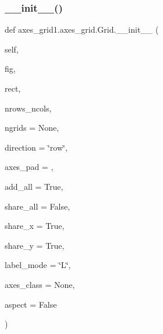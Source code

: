 \subsubsection{\texorpdfstring{\+\_\+\+\_\+init\+\_\+\+\_\+()}{\_\_init\_\_()}}
{\footnotesize\ttfamily def axes\+\_\+grid1.\+axes\+\_\+grid.\+Grid.\+\_\+\+\_\+init\+\_\+\+\_\+ (\begin{DoxyParamCaption}\item[{}]{self,  }\item[{}]{fig,  }\item[{}]{rect,  }\item[{}]{nrows\+\_\+ncols,  }\item[{}]{ngrids = {\ttfamily None},  }\item[{}]{direction = {\ttfamily \char`\"{}row\char`\"{}},  }\item[{}]{axes\+\_\+pad = {},  }\item[{}]{add\+\_\+all = {\ttfamily True},  }\item[{}]{share\+\_\+all = {\ttfamily False},  }\item[{}]{share\+\_\+x = {\ttfamily True},  }\item[{}]{share\+\_\+y = {\ttfamily True},  }\item[{}]{label\+\_\+mode = {\ttfamily \char`\"{}L\char`\"{}},  }\item[{}]{axes\+\_\+class = {\ttfamily None},  }\item[{}]{aspect = {\ttfamily False} }\end{DoxyParamCaption})}

